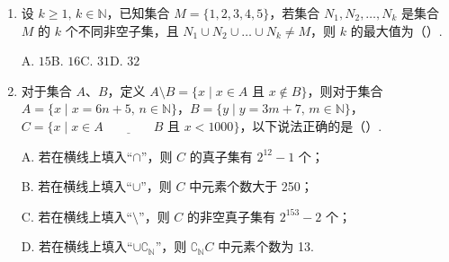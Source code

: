 \documentclass[a4paper,11pt]{article}
\begin{document}
\begin{enumerate}
\fi

\item 设 $k\geqslant 1,\,k\in\mathbb{N}$，已知集合 $M=\{1,2,3,4,5\}$，若集合 $N_1,N_2,\dots,N_k$ 是集合 $M$ 的 $k$ 个不同非空子集，且 $N_1\cup N_2\cup\dots\cup N_k\neq M$，则 $k$ 的最大值为\mbox{（\quad）.}

\keepwithprev
A. $15$\qquad B. $16$\qquad C. $31$\qquad D. $32$


\ifanswer
\solbegin
{}
\solend

\fi

\item 对于集合 $A$、$B$，定义 $A\setminus B=\{x\mid x\in A\text{ 且 }x\notin B\}$，则对于集合 $A=\{x\mid x=6n+5,\,n\in\mathbb{N}\}$，$B=\{y\mid y=3m+7,\,m\in\mathbb{N}\}$，$C=\{x\mid x\in A\underline{\hspace{4em}}B\text{ 且 }x<1000\}$，以下说法正确的是\mbox{（\quad）.}

\keepwithprev
A. 若在横线上填入“$\cap$”，则 $C$ 的真子集有 $2^{12}-1$ 个；

B. 若在横线上填入“$\cup$”，则 $C$ 中元素个数大于 250；

C. 若在横线上填入“$\setminus$”，则 $C$ 的非空真子集有 $2^{153}-2$ 个；

D. 若在横线上填入“$\cup\complement_{\mathbb{N}}$”，则 $\complement_{\mathbb{N}}C$ 中元素个数为 13.


\end{enumerate}
\end{document}
